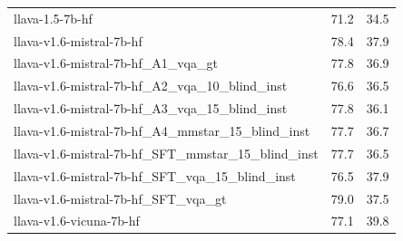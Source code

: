 \begin{tabular}{lrr}
llava-1.5-7b-hf & 71.2 & 34.5 \\
llava-v1.6-mistral-7b-hf & 78.4 & 37.9 \\
llava-v1.6-mistral-7b-hf_A1_vqa_gt & 77.8 & 36.9 \\
llava-v1.6-mistral-7b-hf_A2_vqa_10_blind_inst & 76.6 & 36.5 \\
llava-v1.6-mistral-7b-hf_A3_vqa_15_blind_inst & 77.8 & 36.1 \\
llava-v1.6-mistral-7b-hf_A4_mmstar_15_blind_inst & 77.7 & 36.7 \\
llava-v1.6-mistral-7b-hf_SFT_mmstar_15_blind_inst & 77.7 & 36.5 \\
llava-v1.6-mistral-7b-hf_SFT_vqa_15_blind_inst & 76.5 & 37.9 \\
llava-v1.6-mistral-7b-hf_SFT_vqa_gt & 79.0 & 37.5 \\
llava-v1.6-vicuna-7b-hf & 77.1 & 39.8 \\
\bottomrule
\end{tabular}
